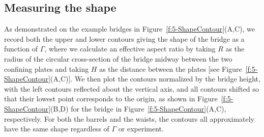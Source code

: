 \subsection{Measuring the shape}
As demonstrated on the example bridges in Figure~\ref{f:5-ShapeContour}(A,C), we record both the upper and lower contours giving the shape of the bridge as a function of $\Gamma$, where we calculate an effective aspect ratio by taking $R$ as the radius of the circular cross-section of the bridge midway between the two confining plates and taking $H$ as the distance between the plates [see Figure~\ref{f:5-ShapeContour}(A,C)].
We then plot the contours normalized by the bridge height, with the left contours reflected about the vertical axis, and all contours shifted so that their lowest point corresponds to the origin, as shown in Figure~\ref{f:5-ShapeContour}(B,D) for the bridge in Figure~\ref{f:5-ShapeContour}(A,C), respectively.
For both the barrels and the waists, the contours all approximately have the same shape regardless of $\Gamma$ or experiment.


